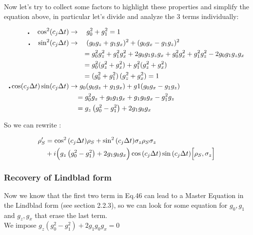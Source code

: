 \documentclass[a4paper,12pt]{article}
\begin{document}
	 \begin{flushleft}
	  		Now let's try to collect some factors to highlight these properties and simplify the equation above, in particular let's divide and analyze the 3 terms individually:
	 \end{flushleft}
	  	
	 \begin{align}
	 	\centerdot \quad \cos^{2}(c_j \Delta t) &\rightarrow \quad g_{0}^{2} + g_{1}^{2} = 1 \notag \\
	 	\centerdot \quad \sin^{2}(c_j \Delta t) &\rightarrow \quad (g_0 g_z + g_1 g_x)^{2} + (g_0 g_x - g_1 g_z)^{2} \notag \\
	 	&\qquad = g_{0}^{2}g_{z}^{2} + g_{1}^{2}g_{x}^{2} + {2 g_{0} g_{1} g_{z} g_{x}} + g_{0}^{2} g_{x}^{2} + g_{1}^{2} g_{z}^{2} - {2 g_{0} g_{1} g_{z} g_{x}} \notag \\ 
	 	&\qquad = g_{0}^{2} (g_{z}^{2} + g_{x}^{2}) + g_{1}^{2} (g_{z}^{2} + g_{x}^{2}) \notag \\
	 	&\qquad = (g_{0}^{2} + g_{1}^{2}) \, (g_{z}^{2} + g_{x}^{2}) = 1 \notag \\
	 	\centerdot \cos(c_j \Delta t)\sin(c_j \Delta t) &\rightarrow g_{0} (g_0 g_z + g_1 g_x) + g1 (g_0 g_x - g_1 g_z) \notag \\
	 	& \quad = g_{0}^{2} g_z + g_{0} g_{1} g_{x} + g_{1} g_{0} g_{x} - g_{1}^{2} g_z \notag \\
	 	& \quad = g_{z}\left(g_{0}^{2} - g_{1}^{2} \right) + 2 g_{1} g_{0} g_{x} \notag
	 \end{align}
	  
	  So we can rewrite : 
	  
	  \begin{align}
	  	\rho_S' &= \cos^{2}{\left(c_j \Delta t \right)} \rho_S + \sin^{2}{\left(c_j \Delta t \right)} \sigma_{z} \rho_S \sigma_{z} \notag \\
	  	&+ i \Big( g_{z}\left(g_{0}^{2} - g_{1}^{2} \right) + 2 g_{1} g_{0} g_{x} \Big) \cos{\left(c_j \Delta t \right)} \sin{\left(c_j \Delta t \right)} \Big[\rho_S , \sigma_{z} \Big]
	  \end{align}
	  
	  \subsubsection{Recovery of Lindblad form}
	  Now we know that the first two term in Eq.46 can lead to a Master Equation in the Lindblad form (see section 2.2.3), so we can look for some equation for $ g_0, g_1 $ and $ g_z, g_x $ that erase the last term. \\
	  We impose $ g_{z}\left(g_{0}^{2} - g_{1}^{2} \right) + 2 g_{1} g_{0} g_{x} = 0 $\\
	  
\end{document}
